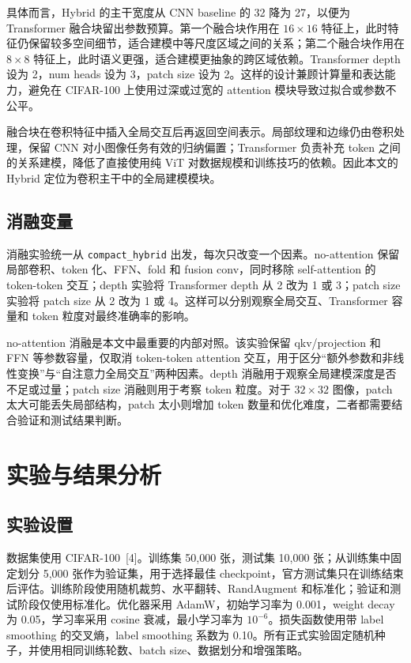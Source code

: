 \documentclass[UTF8,letterpaper,twocolumn]{ctexart}
\newcommand{\model}[1]{\texttt{#1}}
\begin{document}
具体而言，Hybrid 的主干宽度从 CNN baseline 的 32 降为 27，以便为 Transformer 融合块留出参数预算。第一个融合块作用在 $16\times16$ 特征上，此时特征仍保留较多空间细节，适合建模中等尺度区域之间的关系；第二个融合块作用在 $8\times8$ 特征上，此时语义更强，适合建模更抽象的跨区域依赖。Transformer depth 设为 2，num heads 设为 3，patch size 设为 2。这样的设计兼顾计算量和表达能力，避免在 CIFAR-100 上使用过深或过宽的 attention 模块导致过拟合或参数不公平。

融合块在卷积特征中插入全局交互后再返回空间表示。局部纹理和边缘仍由卷积处理，保留 CNN 对小图像任务有效的归纳偏置；Transformer 负责补充 token 之间的关系建模，降低了直接使用纯 ViT 对数据规模和训练技巧的依赖。因此本文的 Hybrid 定位为卷积主干中的全局建模模块。

\subsection{消融变量}
消融实验统一从 \model{compact\_hybrid} 出发，每次只改变一个因素。no-attention 保留局部卷积、token 化、FFN、fold 和 fusion conv，同时移除 self-attention 的 token-token 交互；depth 实验将 Transformer depth 从 2 改为 1 或 3；patch size 实验将 patch size 从 2 改为 1 或 4。这样可以分别观察全局交互、Transformer 容量和 token 粒度对最终准确率的影响。

no-attention 消融是本文中最重要的内部对照。该实验保留 qkv/projection 和 FFN 等参数容量，仅取消 token-token attention 交互，用于区分“额外参数和非线性变换”与“自注意力全局交互”两种因素。depth 消融用于观察全局建模深度是否不足或过量；patch size 消融则用于考察 token 粒度。对于 $32\times32$ 图像，patch 太大可能丢失局部结构，patch 太小则增加 token 数量和优化难度，二者都需要结合验证和测试结果判断。

\section{实验与结果分析}
\subsection{实验设置}
数据集使用 CIFAR-100~[4]。训练集 50,000 张，测试集 10,000 张；从训练集中固定划分 5,000 张作为验证集，用于选择最佳 checkpoint，官方测试集只在训练结束后评估。训练阶段使用随机裁剪、水平翻转、RandAugment 和标准化；验证和测试阶段仅使用标准化。优化器采用 AdamW，初始学习率为 0.001，weight decay 为 0.05，学习率采用 cosine 衰减，最小学习率为 $10^{-6}$。损失函数使用带 label smoothing 的交叉熵，label smoothing 系数为 0.10。所有正式实验固定随机种子，并使用相同训练轮数、batch size、数据划分和增强策略。
\end{document}
